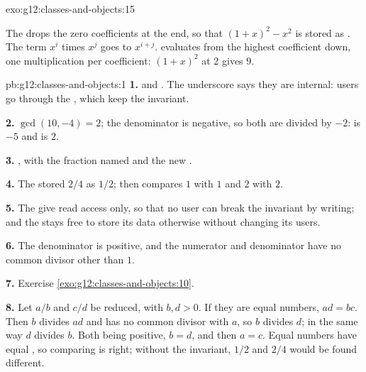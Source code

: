 \begin{solution}{exo:g12:classes-and-objects:15}
\noindent\hspace*{6em}

\noindent\hspace*{8em}

\noindent\hspace*{6em}

\smallskip\noindent The  drops the zero coefficients at the end, so that $(1 + x)^2 - x^2$ is stored as
\code{[1, 2]}. The term $x^i$ times $x^j$ goes to $x^{i+j}$.  evaluates from the highest coefficient
down, one multiplication per coefficient: $(1 + x)^2$ at $2$ gives $9$.
\end{solution}

\begin{solution}{pb:g12:classes-and-objects:1}
\textbf{1.}  and . The underscore says they are internal: users go through the , which
keep the invariant.

\textbf{2.} $\gcd(10, -4) = 2$; the denominator is negative, so both are divided by $-2$:  is $-5$ and
 is $2$.

\textbf{3.} , with  the fraction named  and  the new
.

\textbf{4.} The  stored $2/4$ as $1/2$;  then compares $1$ with $1$ and $2$ with $2$.

\textbf{5.} The  give read access only, so that no user can break the invariant by writing; and the 
stays free to store its data otherwise without changing its users.

\textbf{6.} The denominator is positive, and the numerator and denominator have no common divisor other than $1$.

\textbf{7.} Exercise \ref{exo:g12:classes-and-objects:10}.

\textbf{8.} Let $a/b$ and $c/d$ be reduced, with $b, d > 0$. If they are equal numbers, $ad = bc$. Then $b$ divides
$ad$ and has no common divisor with $a$, so $b$ divides $d$; in the same way $d$ divides $b$. Both being positive,
$b = d$, and then $a = c$. Equal numbers have equal , so comparing  is right; without the
invariant, $1/2$ and $2/4$ would be found different.


\end{solution}
